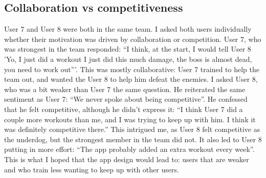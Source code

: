 \documentclass{l4proj}
\begin{document}
\subsection{Collaboration vs competitiveness} User 7 and User 8 were both in the same team. I asked both users individually whether their motivation was driven by collaboration or competition. User 7, who was strongest in the team responded: ``I think, at the start, I would tell User 8 'Yo, I just did a workout I just did this much damage, the boss is almost dead, you need to work out'''. This was mostly collaborative: User 7 trained to help the team out, and wanted the User 8 to help him defeat the enemies. I asked User 8, who was a bit weaker than User 7 the same question. He reiterated the same sentiment as User 7: ``We never spoke about being competitive''.  He confessed that he felt competitive, although he didn't express it: ``I think User 7 did a couple more workouts than me, and I was trying to keep up with him. I think it was definitely competitive there.'' This intrigued me, as User 8 felt competitive as the underdog, but the strongest member in the team did not. It also led to User 8 putting in more effort: ``The app probably added an extra workout every week''. This is what I hoped that the app design would lead to: users that are weaker and who train less wanting to keep up with other users.
\end{document}
